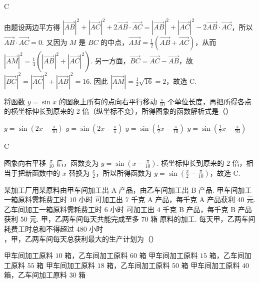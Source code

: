 \begin{answer}
C
\end{answer}

\begin{solution}
由题设两边平方得
\(|\overrightarrow{AB}|^2+|\overrightarrow{AC}|^2+2\overrightarrow{AB}\cdot\overrightarrow{AC}=|\overrightarrow{AB}|^2+|\overrightarrow{AC}|^2-2\overrightarrow{AB}\cdot\overrightarrow{AC}\)，所以 \(\overrightarrow{AB}\cdot\overrightarrow{AC}=0\). 又因为 \(M\) 是 \(BC\) 的中点，\(\overrightarrow{AM}=\frac12(\overrightarrow{AB}+\overrightarrow{AC})\)，从而
\(|\overrightarrow{AM}|^2=\frac14\left(|\overrightarrow{AB}|^2+|\overrightarrow{AC}|^2\right)\).
另一方面，\(\overrightarrow{BC}=\overrightarrow{AC}-\overrightarrow{AB}\)，故 \(|\overrightarrow{BC}|^2=|\overrightarrow{AC}|^2+|\overrightarrow{AB}|^2=16\). 因此 \(|\overrightarrow{AM}|=\frac12\sqrt{16}=2\)，故选 C.
\end{solution}

\begin{problem}
将函数 \( y = \sin x \) 的图象上所有的点向右平行移动 \( \frac{\pi}{10} \) 个单位长度，再把所得各点的横坐标伸长到原来的 2 倍（纵坐标不变），所得图象的函数解析式是（\quad）

\choices
    {\( y = \sin \left(2x - \frac{\pi}{10}\right) \)}
    {\( y = \sin \left(2x - \frac{\pi}{5}\right) \)}
    {\( y = \sin \left(\frac{1}{2}x - \frac{\pi}{10}\right) \)}
    {\( y = \sin \left(\frac{1}{2}x - \frac{\pi}{20}\right) \)}
\end{problem}

\begin{answer}
C
\end{answer}

\begin{solution}
图象向右平移 \(\frac{\pi}{10}\) 后，函数变为 \(y=\sin\left(x-\frac{\pi}{10}\right)\). 横坐标伸长到原来的 \(2\) 倍，相当于把新函数中的 \(x\) 替换为 \(\frac{x}{2}\)，所以所得函数为 \(y=\sin\left(\frac{x}{2}-\frac{\pi}{10}\right)\)，故选 C.
\end{solution}

\begin{problem}
某加工厂用某原料由甲车间加工出 A 产品，由乙车间加工出 B 产品. 甲车间加工一箱原料需耗费工时 \(10\text{ 小时}\) 可加工出 \(7\text{ 千克}\) A 产品，每千克 A 产品获利 \(40\text{ 元}\). 乙车间加工一箱原料需耗费工时 \(6\text{ 小时}\) 可加工出 \(4\text{ 千克}\) B 产品，每千克 B 产品获利 \(50\text{ 元}\). 甲，乙两车间每天共能完成至多 \(70\text{ 箱}\) 原料的加工. 每天甲，乙两车间耗费工时总和不得超过 \(480\text{ 小时}\)，甲，乙两车间每天总获利最大的生产计划为（\quad）

\choices
    {甲车间加工原料 \(10\) 箱，乙车间加工原料 \(60\) 箱}
    {甲车间加工原料 \(15\) 箱，乙车间加工原料 \(55\) 箱}
    {甲车间加工原料 \(18\) 箱，乙车间加工原料 \(50\) 箱}
    {甲车间加工原料 \(40\) 箱，乙车间加工原料 \(30\) 箱}
\end{problem}

